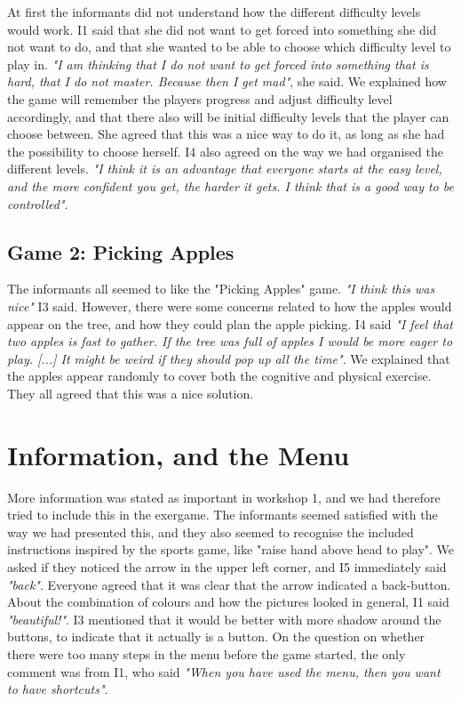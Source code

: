 At first the informants did not understand how the different difficulty levels would work. I1 said that she did not want to get forced into something she did not want to do, and that she wanted to be able to choose which difficulty level to play in. \emph{"I am thinking that I do not want to get forced into something that is hard, that I do not master. Because then I get mad"}, she said. We explained how the game will remember the players progress and adjust difficulty level accordingly, and that there also will be initial difficulty levels that the player can choose between. She agreed that this was a nice way to do it, as long as she had the possibility to choose herself. I4 also agreed on the way we had organised the different levels. \emph{"I think it is an advantage that everyone starts at the easy level, and the more confident you get, the harder it gets. I think that is a good way to be controlled"}.

\subsection{Game 2: Picking Apples}

The informants all seemed to like the "Picking Apples" game. \emph{"I think this was nice"} I3 said. However, there were some concerns related to how the apples would appear on the tree, and how they could plan the apple picking. I4 said \emph{"I feel that two apples is fast to gather. If the tree was full of apples I would be more eager to play. [...] It might be weird if they should pop up all the time"}. We explained that the apples appear randomly to cover both the cognitive and physical exercise. They all agreed that this was a nice solution. 


\section{Information, and the Menu}

More information was stated as important in workshop 1, and we had therefore tried to include this in the exergame. The informants seemed satisfied with the way we had presented this, and they also seemed to recognise the included instructions inspired by the sports game, like "raise hand above head to play". We asked if they noticed the arrow in the upper left corner, and I5 immediately said \emph{"back"}. Everyone agreed that it was clear that the arrow indicated a back-button. About the combination of colours and how the pictures looked in general, I1 said \emph{"beautiful!"}. I3 mentioned that it would be better with more shadow around the buttons, to indicate that it actually is a button. On the question on whether there were too many steps in the menu before the game started, the only comment was from I1, who said \emph{"When you have used the menu, then you want to have shortcuts"}. 

